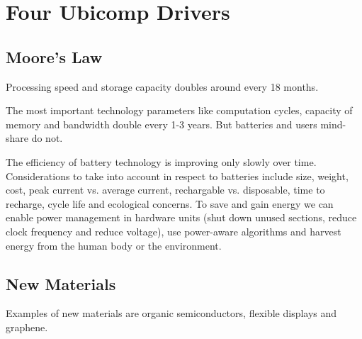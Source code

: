 \section{Four Ubicomp Drivers}

\subsection{Moore's Law}
\begin{mytitle} Processing speed and storage capacity doubles around every 18 months.
\end{mytitle}
\begin{mytitle} The most important technology parameters like computation cycles, capacity of memory and bandwidth double every 1-3 years. But batteries and users mind-share do not. 
\end{mytitle}
\begin{mytitle}[Batteries] The efficiency of battery technology is improving only slowly over time. Considerations to take into account in respect to batteries include size, weight, cost, peak current vs. average current, rechargable vs. disposable, time to recharge, cycle life and ecological concerns. To save and gain energy we can enable power management in hardware units (shut down unused sections, reduce clock frequency and reduce voltage), use power-aware algorithms and harvest energy from the human body or the environment.
\end{mytitle}

\subsection{New Materials}
\begin{mytitle} Examples of new materials are organic semiconductors, flexible displays and graphene. 
\end{mytitle}


